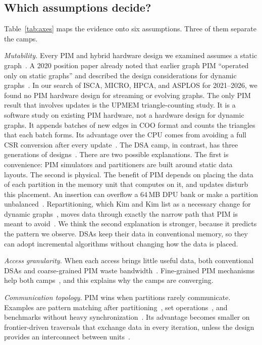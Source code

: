 \documentclass[journal,onecolumn]{IEEEtran}
\begin{document}
\subsection{Which assumptions decide?}
Table~\ref{tab:axes} maps the evidence onto six assumptions. Three of them separate the camps.

\emph{Mutability.} Every PIM and hybrid hardware design we examined assumes a static graph~\cite{ahn2015tesseract,zhang2018graphp,zhuo2019graphq,song2018graphr,shin2025piccolo,shin2025fala,yenimol2026cograf}. A 2020 position paper already noted that earlier graph PIM ``operated only on static graphs'' and described the design considerations for dynamic graphs~\cite{kim2020dynamic}. In our search of ISCA, MICRO, HPCA, and ASPLOS for 2021--2026, we found no PIM hardware design for streaming or evolving graphs. The only PIM result that involves updates is the UPMEM triangle-counting study. It is a software study on existing PIM hardware, not a hardware design for dynamic graphs. It appends batches of new edges in COO format and counts the triangles that each batch forms. Its advantage over the CPU comes from avoiding a full CSR conversion after every update~\cite{asquini2025tc}. The DSA camp, in contrast, has three generations of designs~\cite{rahman2021jetstream,zhao2022tdgraph,gao2023mega}. There are two possible explanations. The first is convenience: PIM simulators and partitioners are built around static data layouts. The second is physical. The benefit of PIM depends on placing the data of each partition in the memory unit that computes on it, and updates disturb this placement. An insertion can overflow a 64\,MB DPU bank or make a partition unbalanced~\cite{cai2024pimpam}. Repartitioning, which Kim and Kim list as a necessary change for dynamic graphs~\cite{kim2020dynamic}, moves data through exactly the narrow path that PIM is meant to avoid~\cite{gomezluna2022prim}. We think the second explanation is stronger, because it predicts the pattern we observe. DSAs keep their data in conventional memory, so they can adopt incremental algorithms without changing how the data is placed.

\emph{Access granularity.} When each access brings little useful data, both conventional DSAs and coarse-grained PIM waste bandwidth~\cite{shin2025piccolo}. Fine-grained PIM mechanisms help both camps~\cite{shin2025fala,yenimol2026cograf}, and this explains why the camps are converging.

\emph{Communication topology.} PIM wins when partitions rarely communicate. Examples are pattern matching after partitioning~\cite{cai2024pimpam}, set operations~\cite{besta2021sisa}, and benchmarks without heavy synchronization~\cite{gomezluna2022prim}. Its advantage becomes smaller on frontier-driven traversals that exchange data in every iteration, unless the design provides an interconnect between units~\cite{zhuo2019graphq,barkhordar2025alphapim}.
\end{document}
